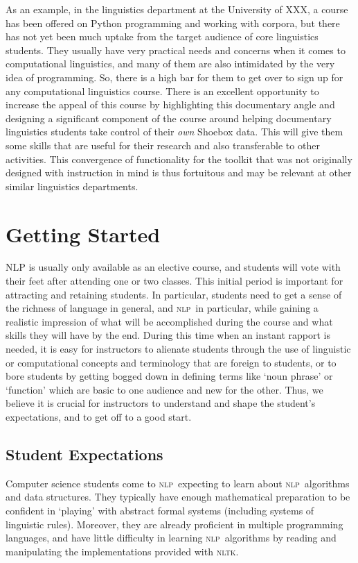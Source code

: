 \documentclass[11pt]{article}
\newcommand{\NLP}{\textsc{nlp}}
\newcommand{\NLTK}{\textsc{nltk}}
\begin{document}
As an example, in the linguistics department at the University of
XXX, a course has been offered on Python programming and
working with corpora, but there has not yet been much uptake from the
target audience of core linguistics students. They usually have very
practical needs and concerns when it comes to computational
linguistics, and many of them are also intimidated by the very idea of
programming. So, there is a high bar for them to get over to sign up
for any computational linguistics course. There is an excellent
opportunity to increase the appeal of this course by highlighting this
documentary angle and designing a significant component of the course
around helping documentary linguistics students take control of their
{\it own} Shoebox data. This will give them some skills that are
useful for their research and also transferable to other activities.
This convergence of functionality for the toolkit that was not
originally designed with instruction in mind is thus fortuitous and
may be relevant at other similar linguistics departments.

\section{Getting Started}
\label{sec:getting-started}

NLP is usually only available as an elective course, and students will
vote with their feet after attending one or two classes.  This initial
period is important for attracting and retaining students.  In
particular, students need to get a sense of the richness of language
in general, and \NLP\ in particular, while gaining a realistic
impression of what will be accomplished during the course and what
skills they will have by the end.  During this time when an instant
rapport is needed, it is easy for instructors to alienate students
through the use of linguistic or computational concepts and
terminology that are foreign to students, or to bore students by
getting bogged down in defining terms like `noun phrase' or
`function' which are basic to one audience and new for the other.
Thus, we believe it is crucial for instructors to understand
and shape the student's expectations, and to get off to a good start.

\subsection{Student Expectations}

Computer science students come to \NLP\ expecting to learn about \NLP\
algorithms and data structures.  They typically have enough
mathematical preparation to be confident in `playing' with abstract
formal systems (including systems of linguistic rules).  Moreover,
they are already proficient in multiple programming languages, and
have little difficulty in learning \NLP\ algorithms by reading and
manipulating the implementations provided with \NLTK.
\end{document}
